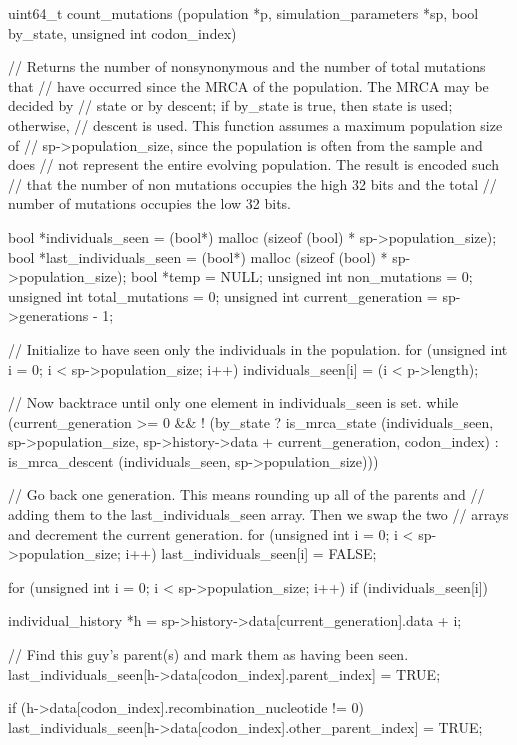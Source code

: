 \documentclass{article}
\begin{document}
\begin{ccode}
uint64_t count_mutations (population *p, simulation_parameters *sp, bool by_state,
			  unsigned int codon_index) {
  // Returns the number of nonsynonymous and the number of total mutations that
  // have occurred since the MRCA of the population. The MRCA may be decided by
  // state or by descent; if by_state is true, then state is used; otherwise,
  // descent is used. This function assumes a maximum population size of
  // sp->population_size, since the population is often from the sample and does
  // not represent the entire evolving population. The result is encoded such
  // that the number of non mutations occupies the high 32 bits and the total
  // number of mutations occupies the low 32 bits.

  bool        *individuals_seen 	= (bool*) malloc (sizeof (bool) * sp->population_size);
  bool        *last_individuals_seen	= (bool*) malloc (sizeof (bool) * sp->population_size);
  bool        *temp			= NULL;
  unsigned int non_mutations		= 0;
  unsigned int total_mutations		= 0;
  unsigned int current_generation	= sp->generations - 1;

  // Initialize to have seen only the individuals in the population.
  for (unsigned int i = 0; i < sp->population_size; i++)
    individuals_seen[i] = (i < p->length);

  // Now backtrace until only one element in individuals_seen is set.
  while (current_generation >= 0 &&
        ! (by_state ?
            is_mrca_state (individuals_seen, sp->population_size,
			   sp->history->data + current_generation, codon_index) :
            is_mrca_descent (individuals_seen, sp->population_size))) {

    // Go back one generation. This means rounding up all of the parents and
    // adding them to the last_individuals_seen array. Then we swap the two
    // arrays and decrement the current generation.
    for (unsigned int i = 0; i < sp->population_size; i++)
      last_individuals_seen[i] = FALSE;

    for (unsigned int i = 0; i < sp->population_size; i++)
      if (individuals_seen[i]) {
        individual_history *h = sp->history->data[current_generation].data + i;

        // Find this guy's parent(s) and mark them as having been seen.
        last_individuals_seen[h->data[codon_index].parent_index] = TRUE;

        if (h->data[codon_index].recombination_nucleotide != 0)
          last_individuals_seen[h->data[codon_index].other_parent_index] = TRUE;

}}}
\end{ccode}
\end{document}
